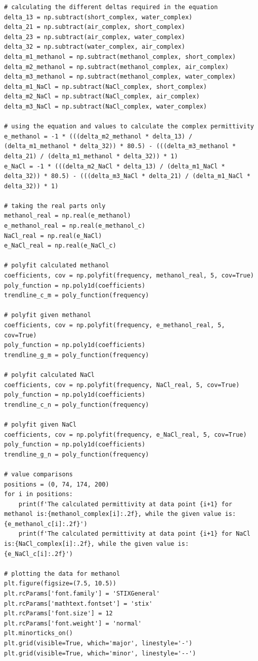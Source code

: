 \documentclass[12pt, a4paper]{article}
\begin{document}
\begin{verbatim}
# calculating the different deltas required in the equation
delta_13 = np.subtract(short_complex, water_complex)
delta_21 = np.subtract(air_complex, short_complex)
delta_23 = np.subtract(air_complex, water_complex)
delta_32 = np.subtract(water_complex, air_complex)
delta_m1_methanol = np.subtract(methanol_complex, short_complex)
delta_m2_methanol = np.subtract(methanol_complex, air_complex)
delta_m3_methanol = np.subtract(methanol_complex, water_complex)
delta_m1_NaCl = np.subtract(NaCl_complex, short_complex)
delta_m2_NaCl = np.subtract(NaCl_complex, air_complex)
delta_m3_NaCl = np.subtract(NaCl_complex, water_complex)

# using the equation and values to calculate the complex permittivity
e_methanol = -1 * (((delta_m2_methanol * delta_13) / (delta_m1_methanol * delta_32)) * 80.5) - (((delta_m3_methanol * delta_21) / (delta_m1_methanol * delta_32)) * 1)
e_NaCl = -1 * (((delta_m2_NaCl * delta_13) / (delta_m1_NaCl * delta_32)) * 80.5) - (((delta_m3_NaCl * delta_21) / (delta_m1_NaCl * delta_32)) * 1)

# taking the real parts only
methanol_real = np.real(e_methanol)
e_methanol_real = np.real(e_methanol_c)
NaCl_real = np.real(e_NaCl)
e_NaCl_real = np.real(e_NaCl_c)

# polyfit calculated methanol
coefficients, cov = np.polyfit(frequency, methanol_real, 5, cov=True)
poly_function = np.poly1d(coefficients)
trendline_c_m = poly_function(frequency)

# polyfit given methanol
coefficients, cov = np.polyfit(frequency, e_methanol_real, 5, cov=True)
poly_function = np.poly1d(coefficients)
trendline_g_m = poly_function(frequency)

# polyfit calculated NaCl
coefficients, cov = np.polyfit(frequency, NaCl_real, 5, cov=True)
poly_function = np.poly1d(coefficients)
trendline_c_n = poly_function(frequency)

# polyfit given NaCl
coefficients, cov = np.polyfit(frequency, e_NaCl_real, 5, cov=True)
poly_function = np.poly1d(coefficients)
trendline_g_n = poly_function(frequency)

# value comparisons
positions = (0, 74, 174, 200)
for i in positions:
    print(f'The calculated permittivity at data point {i+1} for methanol is:{methanol_complex[i]:.2f}, while the given value is: {e_methanol_c[i]:.2f}')
    print(f'The calculated permittivity at data point {i+1} for NaCl is:{NaCl_complex[i]:.2f}, while the given value is: {e_NaCl_c[i]:.2f}')

# plotting the data for methanol
plt.figure(figsize=(7.5, 10.5))
plt.rcParams['font.family'] = 'STIXGeneral'
plt.rcParams['mathtext.fontset'] = 'stix'
plt.rcParams['font.size'] = 12
plt.rcParams['font.weight'] = 'normal'
plt.minorticks_on()
plt.grid(visible=True, which='major', linestyle='-')
plt.grid(visible=True, which='minor', linestyle='--')


\end{verbatim}
\end{document}
